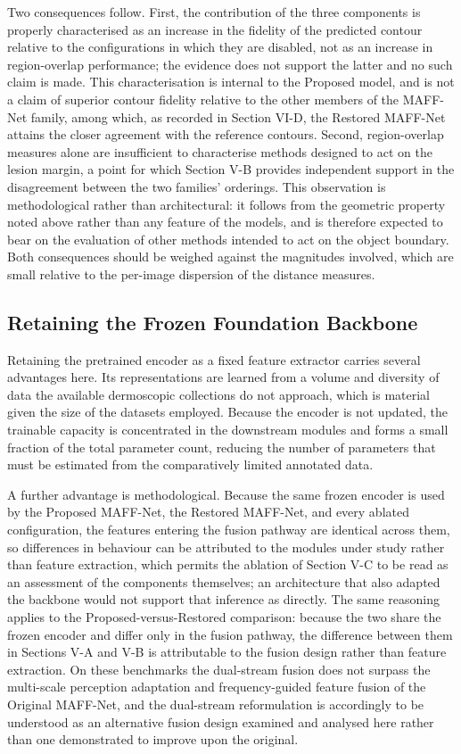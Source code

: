 Two consequences follow. First, the contribution of the three components is properly characterised as an increase in the fidelity of the predicted contour relative to the configurations in which they are disabled, not as an increase in region-overlap performance; the evidence does not support the latter and no such claim is made. This characterisation is internal to the Proposed model, and is not a claim of superior contour fidelity relative to the other members of the MAFF-Net family, among which, as recorded in Section VI-D, the Restored MAFF-Net attains the closer agreement with the reference contours. Second, region-overlap measures alone are insufficient to characterise methods designed to act on the lesion margin, a point for which Section V-B provides independent support in the disagreement between the two families' orderings. This observation is methodological rather than architectural: it follows from the geometric property noted above rather than any feature of the models, and is therefore expected to bear on the evaluation of other methods intended to act on the object boundary. Both consequences should be weighed against the magnitudes involved, which are small relative to the per-image dispersion of the distance measures.

\subsection{Retaining the Frozen Foundation Backbone}

Retaining the pretrained encoder as a fixed feature extractor carries several advantages here. Its representations are learned from a volume and diversity of data the available dermoscopic collections do not approach, which is material given the size of the datasets employed. Because the encoder is not updated, the trainable capacity is concentrated in the downstream modules and forms a small fraction of the total parameter count, reducing the number of parameters that must be estimated from the comparatively limited annotated data.

A further advantage is methodological. Because the same frozen encoder is used by the Proposed MAFF-Net, the Restored MAFF-Net, and every ablated configuration, the features entering the fusion pathway are identical across them, so differences in behaviour can be attributed to the modules under study rather than feature extraction, which permits the ablation of Section V-C to be read as an assessment of the components themselves; an architecture that also adapted the backbone would not support that inference as directly. The same reasoning applies to the Proposed-versus-Restored comparison: because the two share the frozen encoder and differ only in the fusion pathway, the difference between them in Sections V-A and V-B is attributable to the fusion design rather than feature extraction. On these benchmarks the dual-stream fusion does not surpass the multi-scale perception adaptation and frequency-guided feature fusion of the Original MAFF-Net, and the dual-stream reformulation is accordingly to be understood as an alternative fusion design examined and analysed here rather than one demonstrated to improve upon the original.

